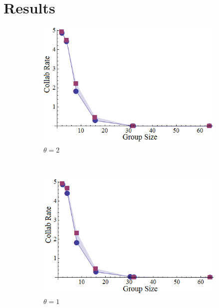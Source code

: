 \documentclass{svmult}  %
\begin{document}
\section{Results}
\begin{figure}[!htb]
\begin{subfigure}{0.33\textwidth}
\centering\includegraphics[width=1.0\textwidth]{figures/LermanCollabCompare3New.png}
\centering\caption{$\theta=2$}\label{fig:lercol3}
\end{subfigure}~
\begin{subfigure}{0.33\textwidth}
\centering\includegraphics[width=1.0\textwidth]{figures/LermanCollabCompare2New.png}
\centering\caption{$\theta=1$}\label{fig:lercol2}
\end{subfigure}~
\begin{subfigure}{0.33\textwidth}

\end{subfigure}
\end{figure}
\end{document}
